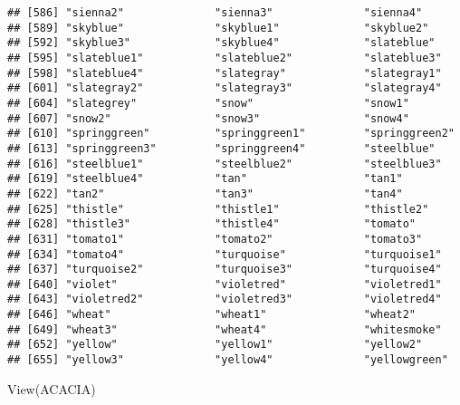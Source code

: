 \documentclass[
]{article}
\newenvironment{Shaded}{\begin{snugshade}}{\end{snugshade}}
\newcommand{\FunctionTok}[1]{\textcolor[rgb]{0.00,0.00,0.00}{#1}}
\newcommand{\NormalTok}[1]{#1}
\begin{document}
\begin{verbatim}
## [586] "sienna2"              "sienna3"              "sienna4"             
## [589] "skyblue"              "skyblue1"             "skyblue2"            
## [592] "skyblue3"             "skyblue4"             "slateblue"           
## [595] "slateblue1"           "slateblue2"           "slateblue3"          
## [598] "slateblue4"           "slategray"            "slategray1"          
## [601] "slategray2"           "slategray3"           "slategray4"          
## [604] "slategrey"            "snow"                 "snow1"               
## [607] "snow2"                "snow3"                "snow4"               
## [610] "springgreen"          "springgreen1"         "springgreen2"        
## [613] "springgreen3"         "springgreen4"         "steelblue"           
## [616] "steelblue1"           "steelblue2"           "steelblue3"          
## [619] "steelblue4"           "tan"                  "tan1"                
## [622] "tan2"                 "tan3"                 "tan4"                
## [625] "thistle"              "thistle1"             "thistle2"            
## [628] "thistle3"             "thistle4"             "tomato"              
## [631] "tomato1"              "tomato2"              "tomato3"             
## [634] "tomato4"              "turquoise"            "turquoise1"          
## [637] "turquoise2"           "turquoise3"           "turquoise4"          
## [640] "violet"               "violetred"            "violetred1"          
## [643] "violetred2"           "violetred3"           "violetred4"          
## [646] "wheat"                "wheat1"               "wheat2"              
## [649] "wheat3"               "wheat4"               "whitesmoke"          
## [652] "yellow"               "yellow1"              "yellow2"             
## [655] "yellow3"              "yellow4"              "yellowgreen"
\end{verbatim}

\begin{Shaded}
\begin{Highlighting}[]
\FunctionTok{View}\NormalTok{(ACACIA)}
\end{Highlighting}
\end{Shaded}
\end{document}
